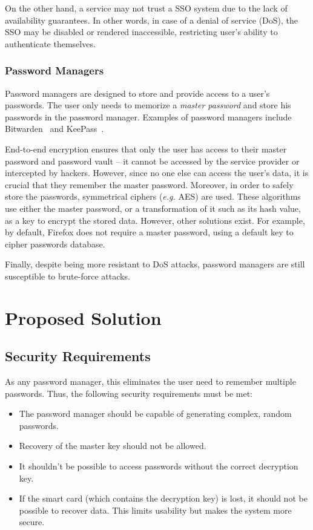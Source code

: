 \documentclass[a4paper, 11pt]{article}
\begin{document}
    On the other hand, a service may not trust a SSO system due to the lack of availability guarantees.
    In other words, in case of a denial of service (DoS), the SSO may be disabled or
    rendered inaccessible, restricting user's ability to authenticate themselves.

    \subsubsection{Password Managers}

    Password managers are designed to store and provide access to a user's passwords.
    The user only needs to memorize a \textit{master password} and store his passwords in the password manager.
    Examples of password managers include Bitwarden~\cite{Bitwarde48:online} and KeePass~\cite{KeePassP1:online}.

    End-to-end encryption ensures that only the user has access to their master password and password vault -- it cannot
    be accessed by the service provider or intercepted by hackers.
    However, since no one else can access the user's data, it is crucial that they remember the master password.
    Moreover, in order to safely store the passwords, symmetrical ciphers (\textit{e.g.} AES) are used.
    These algorithms use either the master password, or a transformation of it such as its hash value,
    as a key to encrypt the stored data.
    However, other solutions exist.
    For example, by default, Firefox does not require a master password, using a default key to cipher passwords database.

    Finally, despite being more resistant to DoS attacks, password managers are still susceptible to brute-force attacks.

    \pagebreak


    \section{Proposed Solution} \label{sec:solution}

    \subsection{Security Requirements}\label{subsec:security-requirements}

    As any password manager, this eliminates the user need to remember multiple passwords.
    Thus, the following security requirements must be met:

    \begin{itemize}
        \item The password manager should be capable of generating complex, random passwords.
        \item Recovery of the master key should not be allowed.
        \item It shouldn't be possible to access passwords without the correct decryption key.
        \item If the smart card (which contains the decryption key) is lost, it should not be possible to recover data.
        This limits usability but makes the system more secure.
    \end{itemize}
\end{document}
